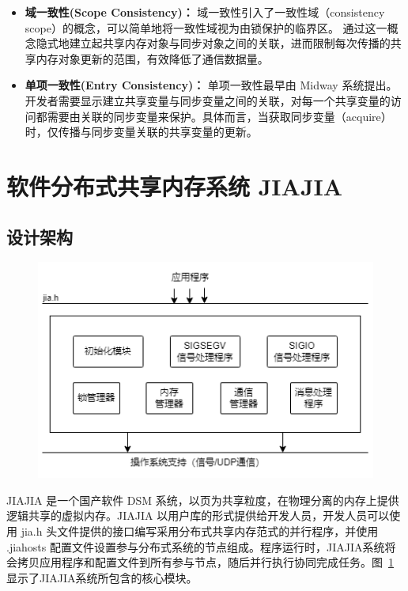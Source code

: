 {\begin{itemize}
        \item \textbf{域一致性(Scope Consistency)：} 域一致性引入了一致性域（consistency scope）的概念，可以简单地将一致性域视为由锁保护的临界区。
              通过这一概念隐式地建立起共享内存对象与同步对象之间的关联，进而限制每次传播的共享内存对象更新的范围，有效降低了通信数据量。

        \item \textbf{单项一致性(Entry Consistency)：} 单项一致性最早由 Midway 系统提出。开发者需要显示建立共享变量与同步变量之间的关联，对每一个共享变量的访问都需要由关联的同步变量来保护。具体而言，当获取同步变量（acquire）时，仅传播与同步变量关联的共享变量的更新。
    \end{itemize}

    \section{软件分布式共享内存系统 JIAJIA}
    \subsection{设计架构}
    \begin{figure}[!htbp]
        \centering
        \includegraphics[width=\textwidth]{Img/JIAJIA-design.png}
        \label{fig:JIAJIA-design}
    \end{figure}
    JIAJIA 是一个国产软件 DSM 系统，以页为共享粒度，在物理分离的内存上提供逻辑共享的虚拟内存。JIAJIA 以用户库的形式提供给开发人员，开发人员可以使用 jia.h 头文件提供的接口编写采用分布式共享内存范式的并行程序，并使用 .jiahosts 配置文件设置参与分布式系统的节点组成。程序运行时，JIAJIA系统将会拷贝应用程序和配置文件到所有参与节点，随后并行执行协同完成任务。图~\ref{fig:JIAJIA-design} 显示了JIAJIA系统所包含的核心模块。

}
